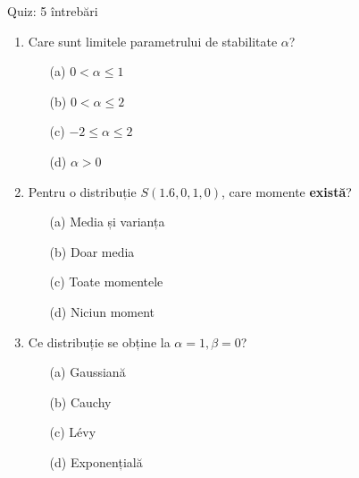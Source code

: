 \documentclass[9pt, aspectratio=169, t]{beamer}
\begin{document}
\begin{frame}{Quiz: 5 întrebări}
    \begin{cminipage}{0.95\textwidth}
\begin{enumerate}\setlength{\itemsep}{0pt}
    \item Care sunt limitele parametrului de stabilitate $\alpha$?
    \begin{enumerate}\setlength{\itemsep}{0pt}
        \item[(a)] $0 < \alpha \leq 1$
        \item[(b)] $0 < \alpha \leq 2$
        \item[(c)] $-2 \leq \alpha \leq 2$
        \item[(d)] $\alpha > 0$
    \end{enumerate}

    \vspace{0.2cm}
    \item Pentru o distribuție $S(1.6, 0, 1, 0)$, care momente \textbf{există}?
    \begin{enumerate}\setlength{\itemsep}{0pt}
        \item[(a)] Media și varianța
        \item[(b)] Doar media
        \item[(c)] Toate momentele
        \item[(d)] Niciun moment
    \end{enumerate}

    \vspace{0.2cm}
    \item Ce distribuție se obține la $\alpha = 1, \beta = 0$?
    \begin{enumerate}\setlength{\itemsep}{0pt}
        \item[(a)] Gaussiană
        \item[(b)] Cauchy
        \item[(c)] L\'{e}vy
        \item[(d)] Exponențială
    \end{enumerate}
\end{enumerate}
    \end{cminipage}
\end{frame}
\end{document}
